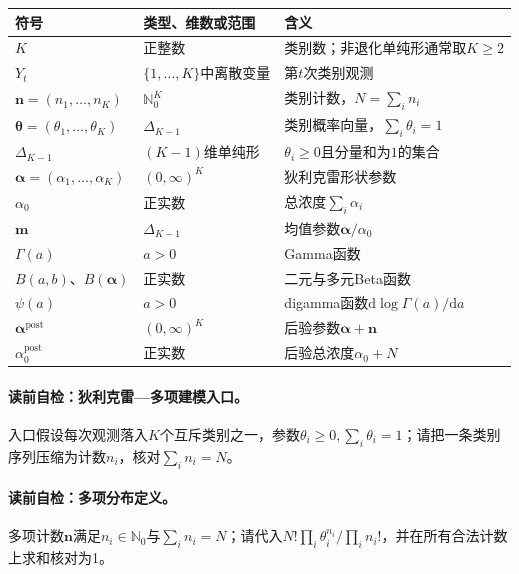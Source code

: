\begin{symboltablebox}
\small
\begin{tabularx}{\linewidth}{@{}l l X@{}}
\toprule 符号 & 类型、维数或范围 & 含义\\ \midrule
$K$ & 正整数 & 类别数；非退化单纯形通常取$K\ge2$\\
$Y_t$ & $\{1,\ldots,K\}$中离散变量 & 第$t$次类别观测\\
$\boldsymbol n=(n_1,\ldots,n_K)$ & $\mathbb N_0^K$ & 类别计数，$N=\sum_i n_i$\\
$\boldsymbol\theta=(\theta_1,\ldots,\theta_K)$ & $\Delta_{K-1}$ & 类别概率向量，$\sum_i\theta_i=1$\\
$\Delta_{K-1}$ & $(K-1)$维单纯形 & $\theta_i\ge0$且分量和为$1$的集合\\
$\boldsymbol\alpha=(\alpha_1,\ldots,\alpha_K)$ & $(0,\infty)^K$ & 狄利克雷形状参数\\
$\alpha_0$ & 正实数 & 总浓度$\sum_i\alpha_i$\\
$\boldsymbol m$ & $\Delta_{K-1}$ & 均值参数$\boldsymbol\alpha/\alpha_0$\\
$\Gamma(a)$ & $a>0$ & Gamma函数\\
$B(a,b)$、$B(\boldsymbol\alpha)$ & 正实数 & 二元与多元Beta函数\\
$\psi(a)$ & $a>0$ & digamma函数$\mathrm d\log\Gamma(a)/\mathrm da$\\
$\boldsymbol\alpha^{\mathrm{post}}$ & $(0,\infty)^K$ & 后验参数$\boldsymbol\alpha+\boldsymbol n$\\
$\alpha_0^{\mathrm{post}}$ & 正实数 & 后验总浓度$\alpha_0+N$\\
\bottomrule
\end{tabularx}
\end{symboltablebox}

\paragraph{读前自检：狄利克雷—多项建模入口。}\DirichletMultinomial{}入口假设每次观测落入$K$个互斥类别之一，参数$\theta_i\ge0,\sum_i\theta_i=1$；请把一条类别序列压缩为计数$n_i$，核对$\sum_i n_i=N$。\par
\paragraph{读前自检：多项分布定义。}多项计数$\boldsymbol n$满足$n_i\in\mathbb N_0$与$\sum_i n_i=N$；请代入$N!\prod_i\theta_i^{n_i}/\prod_i n_i!$，并在所有合法计数上求和核对为1。\par

